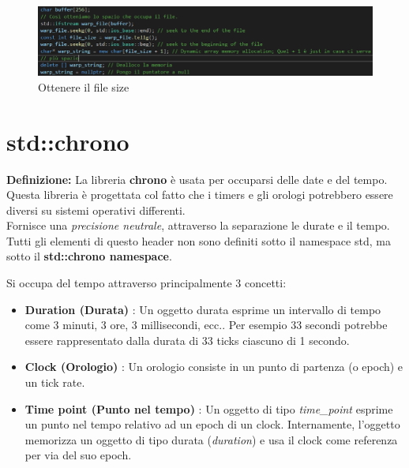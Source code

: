 \begin{figure}[ht]
	\centering
	\includegraphics[width=1.2\textwidth, height=1.2\textheight, keepaspectratio]{./imgs/fstream_file_size2.png}
	\caption{Ottenere il file size}
	\label{fig:fstream_file_size2}
\end{figure}


\newpage

\section{std::chrono}

\textsf{\small \textbf{Definizione: } La libreria \textbf{chrono} è usata per occuparsi delle date e del tempo. Questa libreria è progettata col fatto che i timers e gli orologi potrebbero essere diversi su sistemi operativi differenti.} \\

\textsf{\small Fornisce una \emph{precisione neutrale}, attraverso la separazione le durate e il tempo.} \\

\textsf{\small Tutti gli elementi di questo header non sono definiti sotto il namespace std, ma sotto il \textbf{std::chrono namespace}.} \break

\textsf{\small Si occupa del tempo attraverso principalmente 3 concetti: } \\

\begin{itemize}
	\item \textsf{\small \textbf{Duration (Durata)} : Un oggetto durata esprime un intervallo di tempo come 3 minuti, 3 ore, 3 millisecondi, ecc.. Per esempio 33 secondi potrebbe essere rappresentato dalla durata di 33 ticks ciascuno di 1 secondo.}
	\item \textsf{\small \textbf{Clock (Orologio)} : Un orologio consiste in un punto di partenza (o epoch) e un tick rate.}
	\item \textsf{\small \textbf{Time point (Punto nel tempo)} : Un oggetto di tipo \emph{time\_point} esprime un punto nel tempo relativo ad un epoch di un clock. Internamente, l'oggetto memorizza un oggetto di tipo durata (\emph{duration}) e usa il clock come referenza per via del suo epoch.}
\end{itemize}

